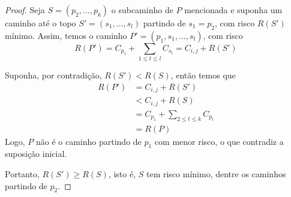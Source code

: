 \begin{proof}
    Seja $S = \left(p_2, \ldots, p_k\right)$ o subcaminho de $P$ mencionada e suponha um caminho até o topo $S' = \left(s_1, \ldots, s_l\right)$ partindo de $s_1 = p_2$, com risco $R(S')$ mínimo. Assim, temos o caminho $P' = \left(p_1, s_1, \ldots, s_l\right)$, com risco
    \[
        R(P') = C_{p_1} + \sum_{1 \leq t \leq l} C_{s_t} = C_{i,j} + R(S')
    \]


    Suponha, por contradição, $R(S') < R(S)$, então temos que
    \begin{align*}
        R(P') &= C_{i,j} + R(S')  \\
            &< C_{i,j} + R(S) \\
            &= C_{p_1} + \sum_{2 \leq t \leq k} C_{p_t} \\
            &= R(P)
    \end{align*}
    Logo, $P$ não é o caminho partindo de $p_1$ com menor risco, o que contradiz a suposição inicial.

    Portanto, $R(S') \geq R(S)$, isto é, $S$ tem risco mínimo, dentre os caminhos partindo de $p_2$.
\end{proof}
